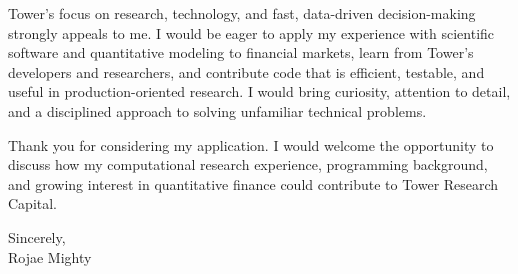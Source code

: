 \documentclass[10pt,letterpaper]{article}
\begin{document}
Tower's focus on research, technology, and fast, data-driven decision-making strongly appeals to me. I would be eager to apply my experience with scientific software and quantitative modeling to financial markets, learn from Tower's developers and researchers, and contribute code that is efficient, testable, and useful in production-oriented research. I would bring curiosity, attention to detail, and a disciplined approach to solving unfamiliar technical problems.

Thank you for considering my application. I would welcome the opportunity to discuss how my computational research experience, programming background, and growing interest in quantitative finance could contribute to Tower Research Capital.

\vspace{4pt}
Sincerely,\\[12pt]
Rojae Mighty
\end{document}
